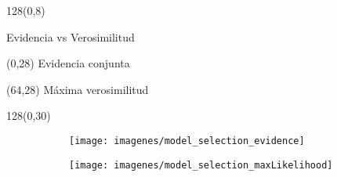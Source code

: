 \documentclass[shownotes]{beamer}
\begin{document}
\begin{frame}
\begin{textblock}{128}(0,8)
\begin{center}
 Evidencia vs Verosimilitud
\end{center}
\end{textblock}



\begin{textblock}{64}(0,28)
 \centering
Evidencia conjunta
\end{textblock}

\begin{textblock}{64}(64,28)
 \centering
 M\'axima verosimilitud
\end{textblock}


\begin{textblock}{128}(0,30)
     \centering 
       \begin{figure}[H]     
     \centering 
     \begin{subfigure}[b]{0.47\textwidth}
       \texttt{[image: imagenes/model\_selection\_evidence]}
     \end{subfigure}
     \begin{subfigure}[b]{0.49\textwidth}
       \texttt{[image: imagenes/model\_selection\_maxLikelihood]}
     \end{subfigure}
\end{figure}
\end{textblock}


\end{frame}
\end{document}
